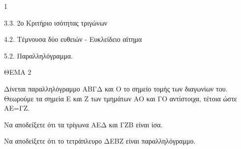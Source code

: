 \begin{ylh}{1}
    \item 3.3. 2ο Κριτήριο ισότητας τριγώνων
    \item 4.2. Τέμνουσα δύο ευθειών - Ευκλείδειο αίτημα
    \item 5.2. Παραλληλόγραμμα.
\end{ylh}

ΘΕΜΑ 2

Δίνεται παραλληλόγραμμο ΑΒΓΔ και Ο το σημείο τομής των διαγωνίων του. Θεωρούμε τα σημεία Ε και Ζ των τμημάτων ΑΟ και ΓΟ αντίστοιχα, τέτοια ώστε ΑΕ=ΓΖ.

\begin{alist}
\item Να αποδείξετε ότι τα τρίγωνα ΑΕΔ και ΓΖΒ είναι ίσα. 

\item Να αποδείξετε ότι το τετράπλευρο ΔΕΒΖ είναι παραλληλόγραμμο. 
\end{alist}
